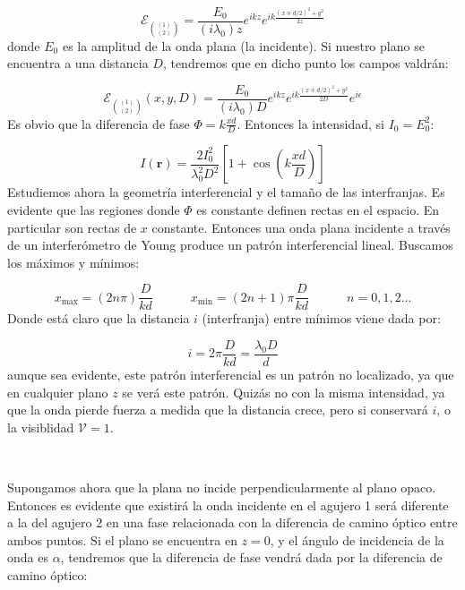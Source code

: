\documentclass[12pt,a4paper]{book}
\numberwithin{equation}{section}
\numberwithin{figure}{section}
\newcommand{\tquad}{\quad \quad \quad}
\newcommand{\parentesis}[1]{\left( #1  \right)}
\newcommand{\ccorchetes}[1]{\left[ #1  \right]}
\newcommand{\1}{_{(1)}}
\newcommand{\2}{_{(2)}}
\newcommand{\rn}{\mathbf{r}}
\theoremstyle{definition}
\begin{document}
\begin{equation}
\mathcal{E}_{\binom{(1)}{(2)}} = \dfrac{E_0}{(i \lambda_0)z} e^{ikz} e^{ik\frac{(x\mp d/2)^2+y^2}{2z}}
\end{equation}
donde $E_0$ es la amplitud de la onda plana (la incidente). Si nuestro plano se encuentra a una distancia $D$, tendremos que en dicho punto los campos valdrán:

\begin{equation}
\mathcal{E}_{\binom{(1)}{(2)}} (x,y,D) = \dfrac{E_0}{(i \lambda_0)D} e^{ikz} e^{ik\frac{(x\mp d/2)^2+y^2}{2D}} e^{i \epsilon}
\end{equation}
Es obvio que la diferencia de fase $\Phi = k \frac{ x d}{D}$. Entonces la intensidad, si $I_0=E_0^2$:

\begin{equation}
I(\rn) = \frac{2I_0^2}{\lambda_0^2 D^2} \ccorchetes{1+\cos \parentesis{k\frac{x d}{D}}}
\end{equation}
Estudiemos ahora la geometría interferencial y el tamaño de las interfranjas. Es evidente que las regiones donde $\Phi$ es constante definen rectas en el espacio. En particular son rectas de $x$ constante. Entonces una onda plana incidente a través de un interferómetro de Young produce un patrón interferencial lineal. Buscamos los máximos y mínimos:

\begin{equation}
x_{\max} = (2n\pi) \frac{D}{kd} \tquad 
x_{\min} = (2n+1)\pi \frac{D}{kd} \tquad n=0,1,2...
\end{equation}
Donde está claro que la distancia $i$ (interfranja) entre mínimos viene dada por:

\begin{equation}
i = 2 \pi \frac{D}{kd} = \dfrac{\lambda_0 D}{d}
\end{equation}
aunque sea evidente, este patrón interferencial es un patrón no localizado, ya que en cualquier plano $z$ se verá este patrón. Quizás no con la misma intensidad, ya que la onda pierde fuerza a medida que la distancia crece, pero si conservará $i$, o la visiblidad $\mathcal{V}=1$. 


\hrulefill \\


\hrulefill 

Supongamos ahora que la plana no incide perpendicularmente al plano opaco. Entonces es evidente que existirá la onda incidente en el agujero 1 será diferente a la del agujero 2 en una fase relacionada con la diferencia de camino óptico entre ambos puntos. Si el plano se encuentra en $z=0$, y el ángulo de incidencia de la onda es $\alpha$, tendremos que la diferencia de fase vendrá dada por la diferencia de camino óptico:
\end{document}

